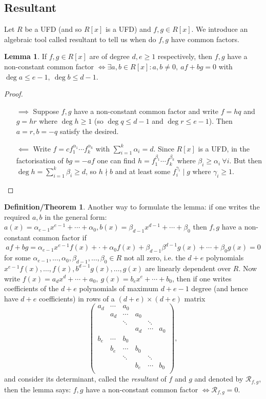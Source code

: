 \documentclass{article}
\newcommand{\re}{\mathcal{R}}
\theoremstyle{definition}
\newtheorem{lemma}[defn]{Lemma}
\newtheorem{defnthm}[defn]{Definition/Theorem}
\begin{document}
\subsection{Resultant}
Let $R$ be a UFD (and so $R[x]$ is a UFD) and $f,g\in R[x]$. We introduce an algebraic tool called resultant to tell us when do $f,g$ have common factors.

\begin{lemma}
If $f,g\in R[x]$ are of degree $d,e\geq 1$ respectively, then $f,g$ have a non-constant common factor $\iff\exists a,b\in R[x]:a,b\neq 0,\ af+bg=0$ with $\deg a\leq e-1,\ \deg b\leq d-1$.
\end{lemma}
\begin{proof}
\begin{itemize}
\item[$\implies$] Suppose $f,g$ have a non-constant common factor and write $f=hq$ and $g=hr$ where $\deg h\geq 1$ (so $\deg q\leq d-1$ and $\deg r\leq e-1$). Then $a=r,b=-q$ satisfy the desired.
\item[$\impliedby$] Write $f=cf_1^{\alpha_1}\cdots f_k^{\alpha_k}$ with $\sum_{i=1}^k\alpha_i=d$. Since $R[x]$ is a UFD, in the factorisation of $bg=-af$ one can find $h=f_1^{\beta_1}\cdots f_k^{\beta_k}$ where $\beta_i\geq\alpha_i \ \forall i$. But then $\deg h=\sum_{i=1}^k\beta_i\geq d$, so $h\nmid b$ and at least some $f_i^{\gamma_i}\mid g$ where $\gamma_i\geq 1$.
\end{itemize}
\end{proof}

\begin{defnthm}
\label{defnthm:resultant}
Another way to formulate the lemma: if one writes the required $a,b$ in the general form: $a(x)=\alpha_{e-1}x^{e-1}+\cdots+\alpha_0,b(x)=\beta_{d-1}x^{d-1}+\cdots+\beta_0$ then $f,g$ have a non-constant common factor if
\[
af+bg=\alpha_{e-1}x^{e-1}f(x)+\cdot+\alpha_0f(x)+\beta_{d-1}\beta^{d-1}g(x)+\cdots+\beta_0g(x)=0
\]
for some $\alpha_{e-1},\ldots,\alpha_0,\beta_{d-1},\ldots,\beta_0\in R$ not all zero, i.e. the $d+e$ polynomials $x^{e-1}f(x),\ldots,f(x),b^{d-1}g(x),\ldots,g(x)$ are linearly dependent over $R$. Now write $f(x)=a_dx^d+\cdots+a_0,\ g(x)=b_ex^e+\cdots+b_0$, then if one writes coefficients of the $d+e$ polynomials of maximum $d+e-1$ degree (and hence have $d+e$ coefficients) in rows of a $(d+e)\times (d+e)$ matrix
\[
\begin{pmatrix}
a_d & \cdots & a_0 \\
& a_d & \cdots & a_0 \\
& & \ddots & & \ddots \\
& & & a_d & \cdots & a_0 \\
b_e & \cdots & b_0 \\
& b_e & \cdots & b_0 \\
& & \ddots & & \ddots \\
& & & b_e & \cdots & b_0 \\
\end{pmatrix},
\]
and consider its determinant, called the \textit{resultant} of $f$ and $g$ and denoted by $\re_{f,g}$, then the lemma says: $f,g$ have a non-constant common factor $\iff\re_{f,g}=0$.
\end{defnthm}
\end{document}
